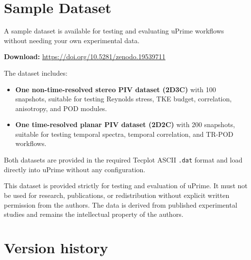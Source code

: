 \documentclass[11pt, a4paper]{report}
\begin{document}
\chapter{Sample Dataset}
\label{app:sample}

A sample dataset is available for testing and evaluating uPrime workflows without needing your own experimental data.

\begin{mdframed}[backgroundcolor=uplightgray, linecolor=upboxborder, linewidth=1pt]
\textbf{Download:} \url{https://doi.org/10.5281/zenodo.19539711}
\end{mdframed}

The dataset includes:

\begin{itemize}[leftmargin=1.5em]
  \item \textbf{One non-time-resolved stereo PIV dataset (2D3C)} with 100 snapshots, suitable for testing Reynolds stress, TKE budget, correlation, anisotropy, and POD modules.
  \item \textbf{One time-resolved planar PIV dataset (2D2C)} with 200 snapshots, suitable for testing temporal spectra, temporal correlation, and TR-POD workflows.
\end{itemize}

Both datasets are provided in the required Tecplot ASCII \texttt{.dat} format and load directly into uPrime without any configuration.

\begin{warnbox}
This dataset is provided strictly for testing and evaluation of uPrime. It must not be used for research, publications, or redistribution without explicit written permission from the authors. The data is derived from published experimental studies and remains the intellectual property of the authors.
\end{warnbox}

\chapter{Version history}
\end{document}
